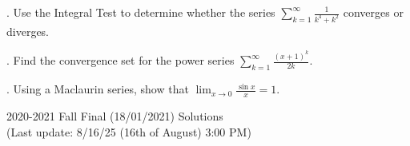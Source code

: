 \documentclass{article}
\begin{document}
\hfill

. Use the Integral Test to determine whether the series $\displaystyle\sum_{k=1}^{\infty}\frac1{k^4+k^2}$ converges or diverges.

\hfill

\hfill

. Find the convergence set for the power series  $\displaystyle\sum_{k=1}^\infty\frac{(x+1)^k}{2k}.$

\hfill

\hfill

. Using a Maclaurin series, show that $\displaystyle\lim_{x\to0}\frac{\sin x}x=1$.

\newpage

\begin{center}
2020-2021 Fall Final (18/01/2021) Solutions\\
(Last update: 8/16/25 (16th of August) 3:00 PM)
\end{center}
\end{document}
